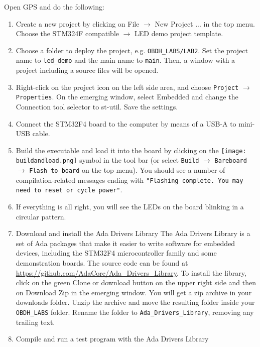 Open GPS and do the following:
\begin{enumerate}
	\item Create a new project by clicking on File $\rightarrow$ New Project ... in the top menu. Choose the STM324F compatible $\rightarrow$ LED demo project template.
	
	\item	Choose a folder to deploy the project, e.g. \textcolor{mPurple}{\texttt{OBDH\_LABS/LAB2}}.
	Set the project name to \texttt{led\_demo} and the main name to \texttt{main}.
	Then, a window with a project including a source files will be opened.
	
	\item	Right-click on the project icon on the left side area,
	and choose {\tt Project} $\rightarrow$ {\tt Properties}.
	On the emerging window,
	select Embedded and change the Connection tool selector to st-util.
	Save the settings.
	
	\item	Connect the STM32F4 board to the computer by means of a USB-A to mini-USB cable.
	
	\item	Build the executable and load it into the board by clicking on the
	\hbox{\texttt{[image: buildandload.png]}} symbol in the tool bar (or select {\tt Build} $\rightarrow$ {\tt Bareboard} $\rightarrow$ {\tt Flash to board} on the top menu). You should see a number of compilation-related messages ending with \texttt{"Flashing complete. You may need to reset or cycle power"}.
	
	\item	If everything is all right, you will see the LEDs on the board blinking in a circular pattern.
	
	\item Download and install the Ada Drivers Library
	The Ada Drivers Library is a set of Ada packages that make it easier to write software for embedded devices, including the STM32F4 microcontroller family and some demonstration boards. The source code can be found at \url{https://github.com/AdaCore/Ada\_Drivers\_Library}. To install the library, click on the green Clone or download button on the upper right side and then on Download Zip in the emerging window. You will get a zip archive in your downloads folder. Unzip the archive and move the resulting folder inside your \textcolor{mPurple}{\texttt{OBDH\_LABS}} folder. Rename the folder to \textcolor{mPurple}{\texttt{Ada\_Drivers\_Library}}, removing any trailing text.
	
	\item Compile and run a test program with the Ada Drivers Library
\end{enumerate}
